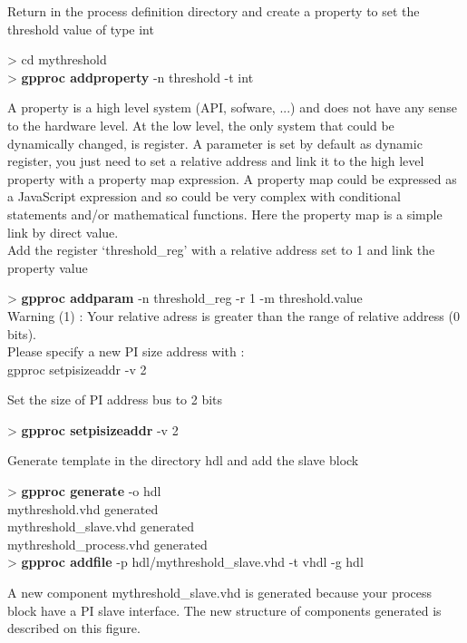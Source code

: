 \documentclass[10pt,a4paper]{article}
\begin{document}
Return in the process definition directory and create a property to set the threshold value of type int
\begin{sample}
> cd mythreshold \\
> \textbf{gpproc addproperty} -n threshold -t int
\end{sample}

A property is a high level system (API, sofware, ...) and does not have any sense to the hardware level. At the low level, the only system that could be dynamically changed, is register. A parameter is set by default as dynamic register, you just need to set a relative address and link it to the high level property with a property map expression. A property map could be expressed as a JavaScript expression and so could be very complex with conditional statements and/or mathematical functions. Here the property map is a simple link by direct value.\\

Add the register `threshold\_reg' with a relative address set to 1 and link the property value
\begin{sample}
> \textbf{gpproc addparam} -n threshold\_reg -r 1 -m threshold.value \\
Warning (1) : Your relative adress is greater than the range of relative address (0 bits). \\
Please specify a new PI size address with : \\
gpproc setpisizeaddr -v 2
\end{sample}

Set the size of PI address bus to 2 bits
\begin{sample}
> \textbf{gpproc setpisizeaddr} -v 2
\end{sample}

Generate template in the directory hdl and add the slave block
\begin{sample}
> \textbf{gpproc generate} -o hdl \\
mythreshold.vhd generated\\
mythreshold\_slave.vhd generated\\
mythreshold\_process.vhd generated\\
> \textbf{gpproc addfile} -p hdl/mythreshold\_slave.vhd -t vhdl -g hdl
\end{sample}

A new component mythreshold\_slave.vhd is generated because your process block have a PI slave interface. The new structure of components generated is described on this figure.
\end{document}

